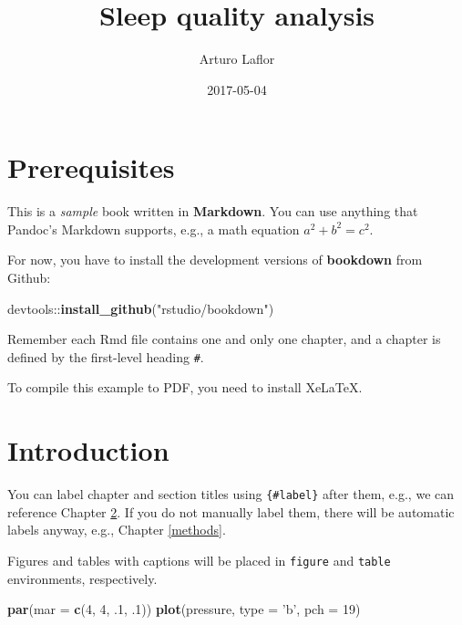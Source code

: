 \documentclass[]{book}
\title{Sleep quality analysis}
\author{Arturo Laflor}
\date{2017-05-04}
\newenvironment{Shaded}{\begin{snugshade}}{\end{snugshade}}
\newcommand{\KeywordTok}[1]{\textcolor[rgb]{0.13,0.29,0.53}{\textbf{{#1}}}}
\newcommand{\DataTypeTok}[1]{\textcolor[rgb]{0.13,0.29,0.53}{{#1}}}
\newcommand{\DecValTok}[1]{\textcolor[rgb]{0.00,0.00,0.81}{{#1}}}
\newcommand{\StringTok}[1]{\textcolor[rgb]{0.31,0.60,0.02}{{#1}}}
\newcommand{\NormalTok}[1]{{#1}}
\begin{document}
\maketitle

{
\setcounter{tocdepth}{1}
\tableofcontents
}
\chapter{Prerequisites}\label{prerequisites}

This is a \emph{sample} book written in \textbf{Markdown}. You can use
anything that Pandoc's Markdown supports, e.g., a math equation
\(a^2 + b^2 = c^2\).

For now, you have to install the development versions of
\textbf{bookdown} from Github:

\begin{Shaded}
\begin{Highlighting}[]
\NormalTok{devtools::}\KeywordTok{install_github}\NormalTok{(}\StringTok{"rstudio/bookdown"}\NormalTok{)}
\end{Highlighting}
\end{Shaded}

Remember each Rmd file contains one and only one chapter, and a chapter
is defined by the first-level heading \texttt{\#}.

To compile this example to PDF, you need to install XeLaTeX.

\chapter{Introduction}\label{intro}

You can label chapter and section titles using \texttt{\{\#label\}}
after them, e.g., we can reference Chapter \ref{intro}. If you do not
manually label them, there will be automatic labels anyway, e.g.,
Chapter \ref{methods}.

Figures and tables with captions will be placed in \texttt{figure} and
\texttt{table} environments, respectively.

\begin{Shaded}
\begin{Highlighting}[]
\KeywordTok{par}\NormalTok{(}\DataTypeTok{mar =} \KeywordTok{c}\NormalTok{(}\DecValTok{4}\NormalTok{, }\DecValTok{4}\NormalTok{, .}\DecValTok{1}\NormalTok{, .}\DecValTok{1}\NormalTok{))}
\KeywordTok{plot}\NormalTok{(pressure, }\DataTypeTok{type =} \StringTok{'b'}\NormalTok{, }\DataTypeTok{pch =} \DecValTok{19}\NormalTok{)}
\end{Highlighting}
\end{Shaded}
\end{document}
